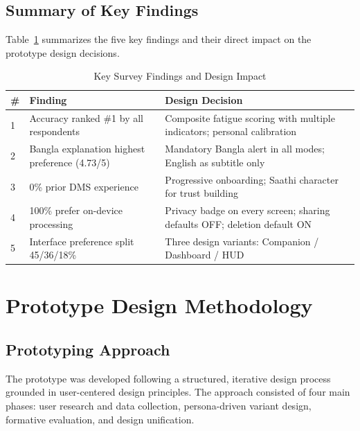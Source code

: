 \documentclass[sigconf]{acmart}
\begin{document}
\subsection{Summary of Key Findings}

Table~\ref{tab:survey_summary} summarizes the five key findings and their direct impact on the prototype design decisions.

\begin{table}[H]
\centering
\caption{Key Survey Findings and Design Impact}
\label{tab:survey_summary}
\small
\begin{tabular}{|p{0.5cm}|p{3.2cm}|p{3.8cm}|}
\hline
\textbf{\#} & \textbf{Finding} & \textbf{Design Decision} \\
\hline
1 & Accuracy ranked \#1 by all respondents & Composite fatigue scoring with multiple indicators; personal calibration \\
\hline
2 & Bangla explanation highest preference (4.73/5) & Mandatory Bangla alert in all modes; English as subtitle only \\
\hline
3 & 0\% prior DMS experience & Progressive onboarding; Saathi character for trust building \\
\hline
4 & 100\% prefer on-device processing & Privacy badge on every screen; sharing defaults OFF; deletion default ON \\
\hline
5 & Interface preference split 45/36/18\% & Three design variants: Companion / Dashboard / HUD \\
\hline
\end{tabular}
\end{table}




\section{Prototype Design Methodology}

\subsection{Prototyping Approach}
The prototype was developed following a structured, iterative design process grounded in user-centered design principles. The approach consisted of four main phases: user research and data collection, persona-driven variant design, formative evaluation, and design unification.
\end{document}
